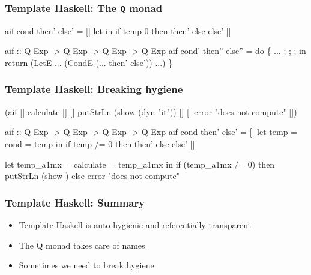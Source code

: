 \documentclass[hyperref={bookmarks=false}]{beamer}
\begin{document}
\begin{frame}[fragile]
\frametitle{Template Haskell: The \texttt{Q} monad}
\begin{semiverbatim}
aif cond then' else' =
  [| let 
         \text{\color{blue}{it = temp}}
     in if temp \text{\color{red}{/=}} 0 then {\textdollar}then' else {\textdollar}else' |]

aif :: Q Exp -> Q Exp -> Q Exp -> Q Exp
aif cond' then'' else'' =
    do \{ ...
       ; \text{\color{blue}{temp <- newName "temp"}}
       ; \text{\color{blue}{it <- newName "it"}}
       ; \text{\color{red}{let notEq = mkNameG_v "ghc-prim" "GHC.Classes" "/="}}
         in return (LetE ... (CondE (... then' else')) ...)
       \}
\end{semiverbatim}
\end{frame}

\begin{frame}[fragile]
\frametitle{Template Haskell: Breaking hygiene}
\begin{semiverbatim}
{\textdollar}(aif [| calculate |]
  [| putStrLn (show \alert{{\textdollar}(dyn "it")}) |]
  [| error "does not compute" |])

aif :: Q Exp -> Q Exp -> Q Exp -> Q Exp
aif cond then' else' =
  [| let temp = {\textdollar}cond
         \text{\color{red}{it}} = temp
     in if temp /= 0 then {\textdollar}then' else {\textdollar}else' |]

let temp_a1mx = calculate
    \text{\color{red}{it_a1my}} = temp_a1mx
in if (temp_a1mx /= 0)
   then putStrLn (show \text{\color{blue}{it_a1my}})
   else error "does not compute"
\end{semiverbatim}
\end{frame}

\begin{frame}[fragile]
\frametitle{Template Haskell: Summary}
\begin{itemize}
\item Template Haskell is auto hygienic and referentially transparent
\item The Q monad takes care of names
\item Sometimes we need to break hygiene
\end{itemize}
\end{frame}
\end{document}
